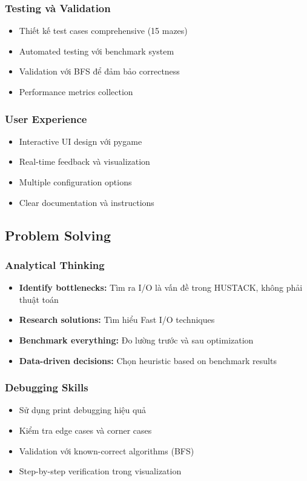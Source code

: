 \documentclass[12pt,a4paper]{article}
\begin{document}
\subsubsection{Testing và Validation}
\begin{itemize}
    \item Thiết kế test cases comprehensive (15 mazes)
    \item Automated testing với benchmark system
    \item Validation với BFS để đảm bảo correctness
    \item Performance metrics collection
\end{itemize}

\subsubsection{User Experience}
\begin{itemize}
    \item Interactive UI design với pygame
    \item Real-time feedback và visualization
    \item Multiple configuration options
    \item Clear documentation và instructions
\end{itemize}

\subsection{Problem Solving}

\subsubsection{Analytical Thinking}
\begin{itemize}
    \item \textbf{Identify bottlenecks:} Tìm ra I/O là vấn đề trong HUSTACK, không phải thuật toán
    \item \textbf{Research solutions:} Tìm hiểu Fast I/O techniques
    \item \textbf{Benchmark everything:} Đo lường trước và sau optimization
    \item \textbf{Data-driven decisions:} Chọn heuristic based on benchmark results
\end{itemize}

\subsubsection{Debugging Skills}
\begin{itemize}
    \item Sử dụng print debugging hiệu quả
    \item Kiểm tra edge cases và corner cases
    \item Validation với known-correct algorithms (BFS)
    \item Step-by-step verification trong visualization
\end{itemize}
\end{document}
